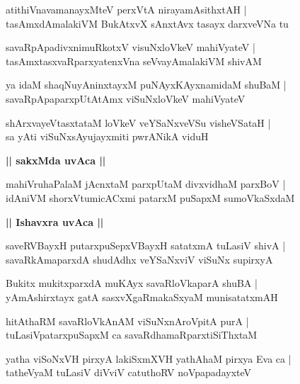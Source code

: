 \documentclass[twoside,12pt,openright]{book}
\newcounter{shloka}[chapter]
\def\uvaca#1{\centerline{{\large\textbf{#1}}}}
\begin{document}
\begin{shloka}%
atithiVnavamanayxMteV perxVtA nirayamAsithxtAH |\\
tasAmxdAmalakiVM BukAtxvX sAnxtAvx tasayx darxveVNa tu 
\end{shloka}

\begin{shloka}%
savaRpApadivxnimuRkotxV visuNxloVkeV mahiVyateV |\\
tasAmxtasxvaRparxyatenxVna seVvayAmalakiVM shivAM 
\end{shloka}

\begin{shloka}%
ya idaM shaqNuyAninxtayxM puNAyxKAyxnamidaM shuBaM |\\
savaRpApaparxpUtAtAmx viSuNxloVkeV mahiVyateV 
\end{shloka}

\begin{shloka}%
shArxvayeVtasxtataM loVkeV veYSaNxveVSu visheVSataH |\\
sa yAti viSuNxsAyujayxmiti pwrANikA viduH 
\end{shloka}

\uvaca{|| sakxMda uvAca ||}

\begin{shloka}%
mahiVruhaPalaM jAcnxtaM parxpUtaM divxvidhaM parxBoV |\\
idAniVM shorxVtumicACxmi patarxM puSapxM sumoVkaSxdaM 
\end{shloka}

\uvaca{|| Ishavxra uvAca ||}

\begin{shloka}%
saveRVBayxH putarxpuSepxVBayxH satatxmA tuLasiV shivA |\\
savaRkAmaparxdA shudAdhx veYSaNxviV viSuNx supirxyA 
\end{shloka}

\begin{shloka}%
Bukitx mukitxparxdA muKAyx savaRloVkaparA shuBA |\\
yAmAshirxtayx gatA sasxvXgaRmakaSxyaM munisatatxmAH
\end{shloka}

\begin{shloka}%
hitAthaRM savaRloVkAnAM viSuNxnAroVpitA purA |\\
tuLasiVpatarxpuSapxM ca savaRdhamaRparxtiSiThxtaM 
\end{shloka}

\begin{shloka}%
yatha viSoNxVH pirxyA lakiSxmXVH yathAhaM pirxya Eva ca |\\
tatheVyaM tuLasiV diVviV catuthoRV noVpapadayxteV 
\end{shloka}
\end{document}
